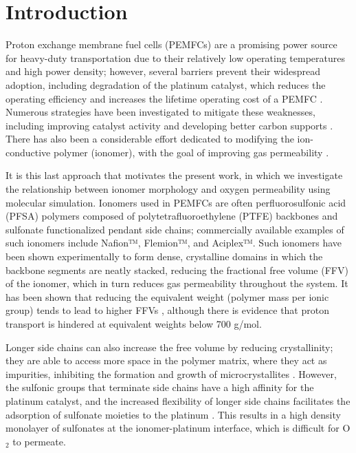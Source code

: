 \documentclass[journal=jacsat,manuscript=article]{achemso}
\begin{document}
\section{Introduction}
Proton exchange membrane fuel cells (PEMFCs) are a promising power source for heavy-duty transportation due to their relatively low operating temperatures and high power density; however, several barriers prevent their widespread adoption\cite{Cullen2021, pemfc-costing}, including degradation of the platinum catalyst, which reduces the operating efficiency and increases the lifetime operating cost of a PEMFC \cite{weber_critical_2014,braaten_studying_2020, wood_nafion_2009,ferreira_instability_2005,braaten_contaminant_2019,yu_mechanism_2011}. Numerous strategies have been investigated to mitigate these weaknesses, including improving catalyst activity \cite{molmen_recent_2021,chandran_high-performance_2018,koh_effects_2008,he_single_2020} and developing better carbon supports \cite{ramaswamy_carbon_2020,yu_carbon-support_2009}. There has also been a considerable effort dedicated to modifying the ion-conductive polymer (ionomer), with the goal of improving gas permeability \cite{jomori_analysis_2012,Greszler_Caulk_Sinha_2012,sakai_analysis_2009,mohamed_effects_2009}. 

It is this last approach that motivates the present work, in which we investigate the relationship between ionomer morphology and oxygen permeability using molecular simulation. Ionomers used in PEMFCs are often perfluorosulfonic acid (PFSA) polymers composed of polytetrafluoroethylene (PTFE) backbones and sulfonate functionalized pendant side chains; commercially available examples of such ionomers include Nafion™, Flemion™, and Aciplex™. Such ionomers have been shown experimentally to form dense, crystalline domains in which the backbone segments are neatly stacked\cite{modestino_controlling_2012, ludvigsson_crystallinity_2000}, reducing the fractional free volume (FFV) of the ionomer, which in turn reduces gas permeability throughout the system. It has been shown that reducing the equivalent weight (polymer mass per ionic group) tends to lead to higher FFVs \cite{wang_evaluation_2012}, although there is evidence that proton transport is hindered at equivalent weights below 700 g/mol\cite{giffin_interplay_2013}. 

Longer side chains can also increase the free volume by reducing crystallinity; they are able to access more space in the polymer matrix, where they act as impurities, inhibiting the formation and growth of microcrystallites \cite{ghielmi_proton_2005}. However, the sulfonic groups that terminate side chains have a high affinity for the platinum catalyst, and the increased flexibility of longer side chains facilitates the adsorption of sulfonate moieties to the platinum \cite{kodama_effect_2018}. This results in a high density monolayer of sulfonates at the ionomer-platinum interface, which is difficult for O$_2$ to permeate. 
\end{document}
